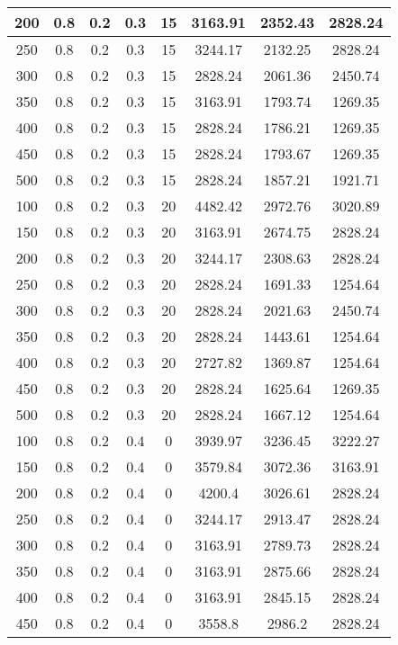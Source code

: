 \documentclass[a4paper, 12pt]{extreport}
\begin{document}
\begin{itemize}
\begin{longtable}{|c|c|c|c|c|c|c|c|}
			200 & 0.8 & 0.2 & 0.3 & 15 & 3163.91 & 2352.43 & 2828.24 \\\hline
			250 & 0.8 & 0.2 & 0.3 & 15 & 3244.17 & 2132.25 & 2828.24 \\\hline
			300 & 0.8 & 0.2 & 0.3 & 15 & 2828.24 & 2061.36 & 2450.74 \\\hline
			350 & 0.8 & 0.2 & 0.3 & 15 & 3163.91 & 1793.74 & 1269.35 \\\hline
			400 & 0.8 & 0.2 & 0.3 & 15 & 2828.24 & 1786.21 & 1269.35 \\\hline
			450 & 0.8 & 0.2 & 0.3 & 15 & 2828.24 & 1793.67 & 1269.35 \\\hline
			500 & 0.8 & 0.2 & 0.3 & 15 & 2828.24 & 1857.21 & 1921.71 \\\hline
			100 & 0.8 & 0.2 & 0.3 & 20 & 4482.42 & 2972.76 & 3020.89 \\\hline
			150 & 0.8 & 0.2 & 0.3 & 20 & 3163.91 & 2674.75 & 2828.24 \\\hline
			200 & 0.8 & 0.2 & 0.3 & 20 & 3244.17 & 2308.63 & 2828.24 \\\hline
			250 & 0.8 & 0.2 & 0.3 & 20 & 2828.24 & 1691.33 & 1254.64 \\\hline
			300 & 0.8 & 0.2 & 0.3 & 20 & 2828.24 & 2021.63 & 2450.74 \\\hline
			350 & 0.8 & 0.2 & 0.3 & 20 & 2828.24 & 1443.61 & 1254.64 \\\hline
			400 & 0.8 & 0.2 & 0.3 & 20 & 2727.82 & 1369.87 & 1254.64 \\\hline
			450 & 0.8 & 0.2 & 0.3 & 20 & 2828.24 & 1625.64 & 1269.35 \\\hline
			500 & 0.8 & 0.2 & 0.3 & 20 & 2828.24 & 1667.12 & 1254.64 \\\hline
			100 & 0.8 & 0.2 & 0.4 & 0 & 3939.97 & 3236.45 & 3222.27 \\\hline
			150 & 0.8 & 0.2 & 0.4 & 0 & 3579.84 & 3072.36 & 3163.91 \\\hline
			200 & 0.8 & 0.2 & 0.4 & 0 & 4200.4 & 3026.61 & 2828.24 \\\hline
			250 & 0.8 & 0.2 & 0.4 & 0 & 3244.17 & 2913.47 & 2828.24 \\\hline
			300 & 0.8 & 0.2 & 0.4 & 0 & 3163.91 & 2789.73 & 2828.24 \\\hline
			350 & 0.8 & 0.2 & 0.4 & 0 & 3163.91 & 2875.66 & 2828.24 \\\hline
			400 & 0.8 & 0.2 & 0.4 & 0 & 3163.91 & 2845.15 & 2828.24 \\\hline
			450 & 0.8 & 0.2 & 0.4 & 0 & 3558.8 & 2986.2 & 2828.24 \\\hline

\end{longtable}
\end{itemize}
\end{document}
